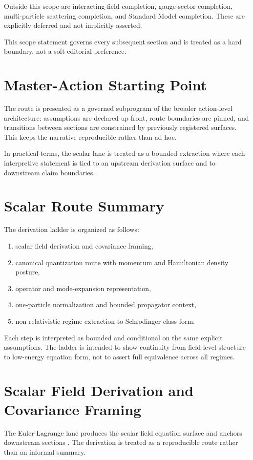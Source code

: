 \documentclass[11pt]{article}
\begin{document}
Outside this scope are interacting-field completion, gauge-sector completion, multi-particle scattering completion, and Standard Model completion. These are explicitly deferred and not implicitly asserted.

This scope statement governs every subsequent section and is treated as a hard boundary, not a soft editorial preference.

\section{Master-Action Starting Point}
The route is presented as a governed subprogram of the broader action-level architecture: assumptions are declared up front, route boundaries are pinned, and transitions between sections are constrained by previously registered surfaces. This keeps the narrative reproducible rather than ad hoc.

In practical terms, the scalar lane is treated as a bounded extraction where each interpretive statement is tied to an upstream derivation surface and to downstream claim boundaries.

\section{Scalar Route Summary}
The derivation ladder is organized as follows:
\begin{enumerate}
\item scalar field derivation and covariance framing,
\item canonical quantization route with momentum and Hamiltonian density posture,
\item operator and mode-expansion representation,
\item one-particle normalization and bounded propagator context,
\item non-relativistic regime extraction to Schrodinger-class form.
\end{enumerate}

Each step is interpreted as bounded and conditional on the same explicit assumptions. The ladder is intended to show continuity from field-level structure to low-energy equation form, not to assert full equivalence across all regimes.

\section{Scalar Field Derivation and Covariance Framing}
The Euler-Lagrange lane produces the scalar field equation surface and anchors downstream sections \cite{toescalarfieldderivation}. The derivation is treated as a reproducible route rather than an informal summary.
\end{document}
